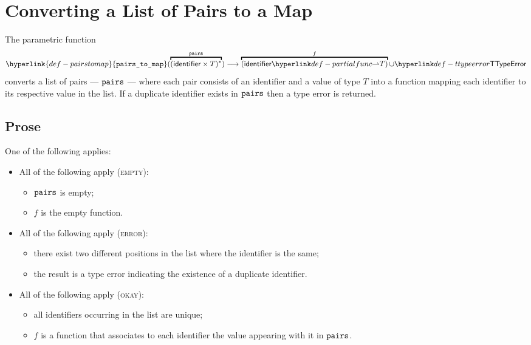 \documentclass{book}
\newcommand\pairstomap[0]{\hyperlink{def-pairstomap}{\texttt{pairs\_to\_map}}}
\begin{document}
\hypertarget{def-pairstomap}{}
\section{Converting a List of Pairs to a Map \label{sec:PairsToMap}}
The parametric function
\[
  \pairstomap(\overname{(\identifier\times T)^*}{\pairs}) \aslto \overname{(\identifier\partialto T)}{f} \cup \TTypeError
\]
converts a list of pairs --- $\texttt{pairs}$ --- where each pair consists of an identifier and a value
of type $T$ into a function mapping each identifier to its respective value in the list.
If a duplicate identifier exists in $\texttt{pairs}$ then a type error is returned.

\subsection{Prose}
One of the following applies:
\begin{itemize}
  \item All of the following apply (\textsc{empty}):
  \begin{itemize}
    \item $\texttt{pairs}$ is empty;
    \item $f$ is the empty function.
  \end{itemize}

  \item All of the following apply (\textsc{error}):
  \begin{itemize}
    \item there exist two different positions in the list where the identifier is the same;
    \item the result is a type error indicating the existence of a duplicate identifier.
  \end{itemize}

  \item All of the following apply (\textsc{okay}):
  \begin{itemize}
    \item all identifiers occurring in the list are unique;
    \item $f$ is a function that associates to each identifier the value appearing with it in $\texttt{pairs}$.
  \end{itemize}
\end{itemize}
\end{document}
